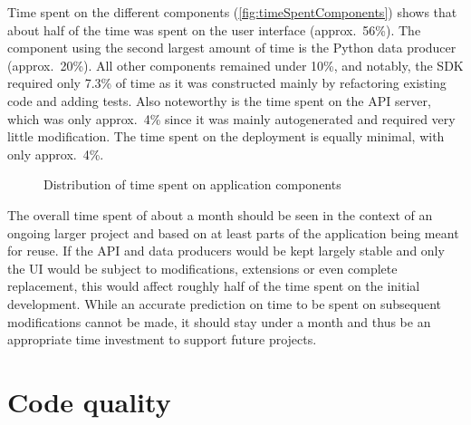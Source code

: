 Time spent on the different components (\autoref{fig:timeSpentComponents}) shows that about half of the time was spent on the user interface (approx.~56\%). The component using the second largest amount of time is the Python data producer (approx.~20\%).
All other components remained under 10\%, and notably, the \ac{SDK} required only 7.3\% of time as it was constructed mainly by refactoring existing code and adding tests.
Also noteworthy is the time spent on the \ac{API} server, which was only approx.~4\% since it was mainly autogenerated and required very little modification.
The time spent on the deployment is equally minimal, with only approx.~4\%.

\begin{figure*}[!ht]
\centering
\hfill
\caption[Time spent by application components]{Distribution of time spent on application components\protect}
\label{fig:timeSpentComponents}
\end{figure*}

The overall time spent of about a month should be seen in the context of an ongoing larger project and based on at least parts of the application being meant for reuse.
If the \ac{API} and data producers would be kept largely stable and only the \ac{UI} would be subject to modifications, extensions or even complete replacement, this would affect roughly half of the time spent on the initial development.
While an accurate prediction on time to be spent on subsequent modifications cannot be made, it should stay under a month and thus be an appropriate time investment to support future projects.

\section{Code quality}
\label{sec:code-quality}

